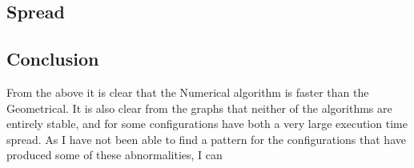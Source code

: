 \subsection{Spread}
%



\subsection{Conclusion}

From the above it is clear that the Numerical algorithm is faster than the Geometrical. It is also clear from the graphs that neither of the algorithms are entirely stable, and for some configurations have both a very large execution time spread. As I have not been able to find a pattern for the configurations that have produced some of these abnormalities, I can 
